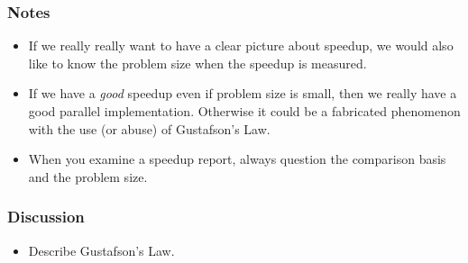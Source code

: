 \documentclass{beamer}
\begin{document}
\begin{CJK}{UTF8}{bsmi}
\begin{frame}
\frametitle{Notes}
\begin{itemize}
\item If we really really want to have a clear picture about speedup,
  we would also like to know the problem size when the speedup is
  measured.
\item If we have a {\em good} speedup even if problem size is small,
  then we really have a good parallel implementation.  Otherwise it
  could be a fabricated phenomenon with the use (or abuse) of
  Gustafson's Law.
\item When you examine a speedup report, always question the
  comparison basis and the problem size.
\end{itemize}
\end{frame}

\begin{frame}
\frametitle{Discussion}
\begin{itemize}
\item Describe Gustafson's Law.
\end{itemize}
\end{frame}

\end{CJK}
\end{document}
